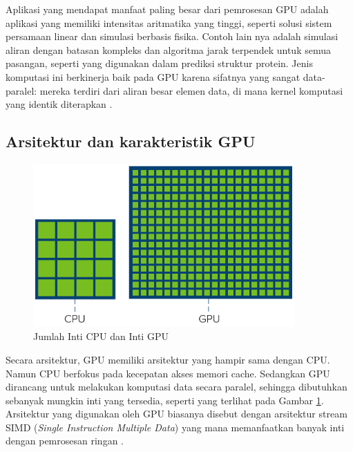 Aplikasi yang mendapat manfaat paling besar dari pemrosesan GPU adalah aplikasi
yang memiliki intensitas aritmatika yang tinggi, seperti solusi sistem
persamaan linear dan simulasi berbasis fisika. Contoh lain nya adalah simulasi
aliran dengan batasan kompleks dan algoritma jarak terpendek untuk semua
pasangan, seperti yang digunakan dalam prediksi struktur protein. Jenis
komputasi ini berkinerja baik pada GPU karena sifatnya yang sangat
data-paralel: mereka terdiri dari aliran besar elemen data, di mana kernel
komputasi yang identik diterapkan \citep{pharrGPUGemsProgramming2005}.

\subsection{Arsitektur dan karakteristik GPU}


\begin{figure}[H]
	\centering
	\includegraphics[width=10cm]{images/cpu-vs-gpu-cores.png}
	\caption{Jumlah Inti CPU dan Inti GPU}
	\label{gambar gpu-cpu cores}
\end{figure}

Secara arsitektur, GPU memiliki arsitektur yang hampir sama dengan CPU. Namun
CPU berfokus pada kecepatan akses memori cache. Sedangkan GPU dirancang untuk
melakukan komputasi data secara paralel, sehingga dibutuhkan sebanyak mungkin
inti yang tersedia, seperti yang terlihat pada Gambar \ref{gambar gpu-cpu cores}.
Arsitektur yang digunakan oleh GPU biasanya disebut dengan arsitektur
stream SIMD (\emph{Single Instruction Multiple Data}) yang mana memanfaatkan
banyak inti dengan pemrosesan ringan \citep{helenGPUArchitectureStructure2020}.



